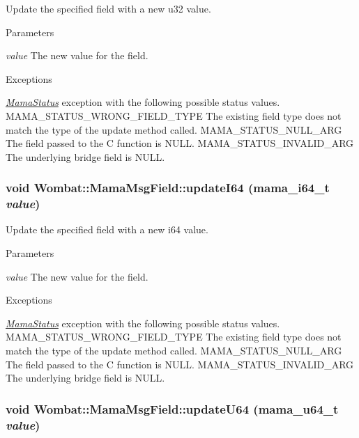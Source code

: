 Update the specified field with a new u32 value. 
\begin{DoxyParams}{Parameters}
\item[{\em value}]The new value for the field.\end{DoxyParams}

\begin{DoxyExceptions}{Exceptions}
\item[{\em \hyperlink{classWombat_1_1MamaStatus}{MamaStatus}}]exception with the following possible status values. MAMA\_\-STATUS\_\-WRONG\_\-FIELD\_\-TYPE The existing field type does not match the type of the update method called. MAMA\_\-STATUS\_\-NULL\_\-ARG The field passed to the C function is NULL. MAMA\_\-STATUS\_\-INVALID\_\-ARG The underlying bridge field is NULL. \end{DoxyExceptions}
\hypertarget{classWombat_1_1MamaMsgField_a7413fdf503d60020b64c0fc56217c52c}{
\subsubsection[{updateI64}]{\setlength{\rightskip}{0pt plus 5cm}void Wombat::MamaMsgField::updateI64 (mama\_\-i64\_\-t {\em value})}}
\label{classWombat_1_1MamaMsgField_a7413fdf503d60020b64c0fc56217c52c}


Update the specified field with a new i64 value. 
\begin{DoxyParams}{Parameters}
\item[{\em value}]The new value for the field.\end{DoxyParams}

\begin{DoxyExceptions}{Exceptions}
\item[{\em \hyperlink{classWombat_1_1MamaStatus}{MamaStatus}}]exception with the following possible status values. MAMA\_\-STATUS\_\-WRONG\_\-FIELD\_\-TYPE The existing field type does not match the type of the update method called. MAMA\_\-STATUS\_\-NULL\_\-ARG The field passed to the C function is NULL. MAMA\_\-STATUS\_\-INVALID\_\-ARG The underlying bridge field is NULL. \end{DoxyExceptions}
\hypertarget{classWombat_1_1MamaMsgField_a501ffcb46daf723bd39626ab7a2b5e09}{
\subsubsection[{updateU64}]{\setlength{\rightskip}{0pt plus 5cm}void Wombat::MamaMsgField::updateU64 (mama\_\-u64\_\-t {\em value})}}
\label{classWombat_1_1MamaMsgField_a501ffcb46daf723bd39626ab7a2b5e09}


